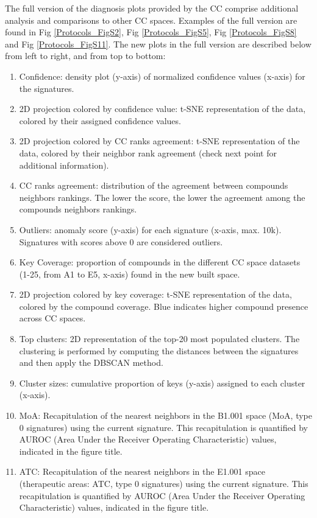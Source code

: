 The full version of the diagnosis plots provided by the CC comprise additional analysis and comparisons to other CC spaces. Examples of the full version are found in Fig \ref{Protocols_FigS2}, Fig \ref{Protocols_FigS5}, Fig \ref{Protocols_FigS8} and Fig \ref{Protocols_FigS11}. The new plots in the full version are described below from left to right, and from top to bottom:
\begin{enumerate}
    \item[\textbullet]Confidence: density plot (y-axis) of normalized confidence values (x-axis) for the signatures.
    \item[\textbullet]2D projection colored by confidence value: t-SNE representation of the data, colored by their assigned confidence values.
    \item[\textbullet]2D projection colored by CC ranks agreement:  t-SNE representation of the data, colored by their neighbor rank agreement (check next point for additional information).
    \item[\textbullet]CC ranks agreement: distribution of the agreement between compounds neighbors rankings. The lower the score, the lower the agreement among the compounds neighbors rankings.
    \item[\textbullet]Outliers: anomaly score (y-axis) for each signature (x-axis, max. 10k). Signatures with scores above 0 are considered outliers.
    \item[\textbullet]Key Coverage: proportion of compounds in the different CC space datasets (1-25, from A1 to E5, x-axis) found in the new built space.
    \item[\textbullet]2D projection colored by key coverage: t-SNE representation of the data, colored by the compound coverage. Blue indicates higher compound presence across CC spaces.
    \item[\textbullet]Top clusters: 2D representation of the top-20 most populated clusters. The clustering is performed by computing the distances between the signatures and then apply the DBSCAN method.
    \item[\textbullet]Cluster sizes: cumulative proportion of keys (y-axis) assigned to each cluster (x-axis).
    \item[\textbullet]MoA: Recapitulation of the nearest neighbors in the B1.001 space (MoA, type 0 signatures) using the current signature. This recapitulation is quantified by AUROC (Area Under the Receiver Operating Characteristic) values, indicated in the figure title. 
    \item[\textbullet]ATC: Recapitulation of the nearest neighbors in the E1.001 space (therapeutic areas: ATC, type 0 signatures) using the current signature. This recapitulation is quantified by AUROC (Area Under the Receiver Operating Characteristic) values, indicated in the figure title. 

\end{enumerate}

